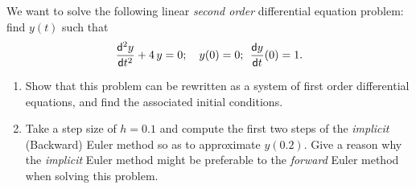 \documentclass[12pt]{article}
\newcommand{\dif}{\mathsf{d}}
\begin{document}
\medskip
\question 
We want to solve the following  linear  {\it  second order} differential equation
problem: find  $y(t)$ such that
$$
{\dif^2 y\over \dif t^2} + 4\,y =0 ; \quad y(0)=0; \>\> {\dif y\over \dif t} (0)=1.
$$

\begin{enumerate}
\item
Show that this problem can be rewritten  as a system of
first order differential equations, and find the associated initial conditions.
\null\vspace{-0.2cm} 

\item
 Take a  step size  of $h=0.1$  and 
compute the first two steps of the  {\it implicit} (Backward) Euler  method
 so as to approximate $y(0.2)$.  Give a reason why the {\it implicit} Euler 
 method might be preferable
 to the  {\it forward} Euler method when solving this problem.
 \null\vspace{-0.2cm} 
 
\end{enumerate}



\finished
\end{document}
